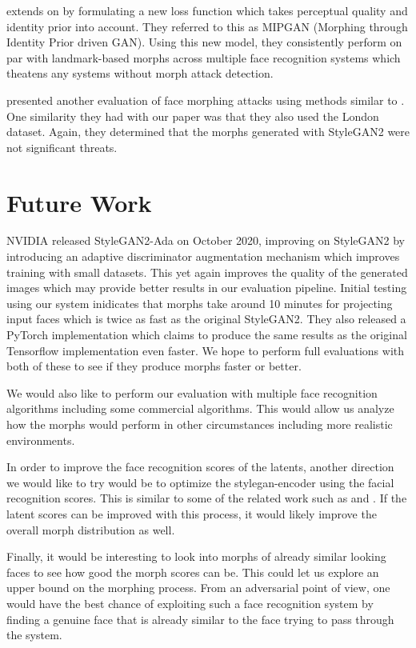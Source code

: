 \documentclass[12pt,twocolumn]{paper}
\begin{document}
\par
\cite{zhang2021mipgan} extends on \cite{venkatesh2020gan} by formulating a new loss function which takes perceptual quality and identity prior into account. They referred to this as MIPGAN (Morphing through Identity Prior driven GAN). Using this new model, they consistently perform on par with landmark-based morphs across multiple face recognition systems which theatens any systems without morph attack detection. 
\par
\cite{sarkar2020vulnerability} presented another evaluation of face morphing attacks using methods similar to \cite{venkatesh2020gan}. One similarity they had with our paper was that they also used the London dataset. Again, they determined that the morphs generated with StyleGAN2 were not significant threats.


\section{Future Work}
\par
NVIDIA released StyleGAN2-Ada \cite{stylegan2-ada} on October 2020, improving on StyleGAN2 by introducing an adaptive discriminator augmentation mechanism which improves training with small datasets. This yet again improves the quality of the generated images which may provide better results in our evaluation pipeline. Initial testing using our system inidicates that morphs take around 10 minutes for projecting input faces which is twice as fast as the original StyleGAN2. They also released a PyTorch implementation which claims to produce the same results as the original Tensorflow implementation even faster. We hope to perform full evaluations with both of these to see if they produce morphs faster or better.
\par
We would also like to perform our evaluation with multiple face recognition algorithms including some commercial algorithms. This would allow us analyze how the morphs would perform in other circumstances including more realistic environments.
\par
In order to improve the face recognition scores of the latents, another direction we would like to try would be to optimize the stylegan-encoder using the facial recognition scores. This is similar to some of the related work such as \cite{venkatesh2020gan} and \cite{zhang2021mipgan}. If the latent scores can be improved with this process, it would likely improve the overall morph distribution as well.
\par
Finally, it would be interesting to look into morphs of already similar looking faces to see how good the morph scores can be. This could let us explore an upper bound on the morphing process. From an adversarial point of view, one would have the best chance of exploiting such a face recognition system by finding a genuine face that is already similar to the face trying to pass through the system.
\end{document}
